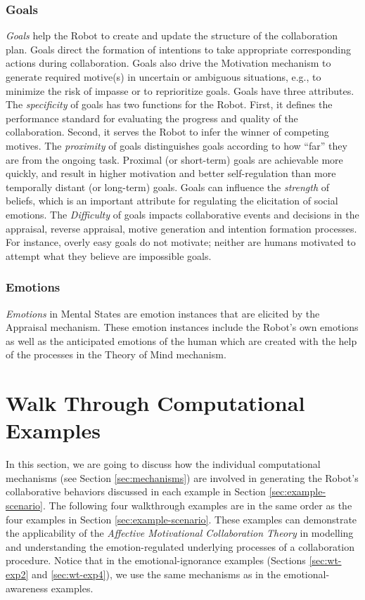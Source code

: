 \subsubsection{Goals}
\label{sec:goals}

\textit{Goals} help the Robot to create and update the structure of the
collaboration plan. Goals direct the formation of intentions to take appropriate
corresponding actions during collaboration. Goals also drive the Motivation
mechanism to generate required motive(s) in uncertain or ambiguous situations,
e.g., to minimize the risk of impasse or to reprioritize goals. Goals have
three attributes. The \textit{specificity} of goals has two functions for the
Robot. First, it defines the performance standard for evaluating the progress
and quality of the collaboration. Second, it serves the Robot to infer the
winner of competing motives. The \textit{proximity} of goals distinguishes goals
according to how ``far'' they are from the ongoing task. Proximal (or
short-term) goals are achievable more quickly, and result in higher motivation
and better self-regulation than more temporally distant (or long-term) goals.
Goals can influence the \textit{strength} of beliefs, which is an important
attribute for regulating the elicitation of social emotions. The
\textit{Difficulty} of goals impacts collaborative events and decisions in the
appraisal, reverse appraisal, motive generation and intention formation
processes. For instance, overly easy goals do not motivate; neither are humans
motivated to attempt what they believe are impossible goals.

\subsubsection{Emotions}

\textit{Emotions} in Mental States are emotion instances that are elicited by
the Appraisal mechanism. These emotion instances include the Robot's own
emotions as well as the anticipated emotions of the human which are created with
the help of the processes in the Theory of Mind mechanism.

\section{Walk Through Computational Examples}
\label{sec:wtce}

In this section, we are going to discuss how the individual computational
mechanisms (see Section \ref{sec:mechanisms}) are involved in generating the
Robot's collaborative behaviors discussed in each example in Section
\ref{sec:example-scenario}. The following four walkthrough examples are in the
same order as the four examples in Section \ref{sec:example-scenario}. These
examples can demonstrate the applicability of the \textit{Affective Motivational
Collaboration Theory} in modelling and understanding the emotion-regulated
underlying processes of a collaboration procedure. Notice that in the
emotional-ignorance examples (Sections \ref{sec:wt-exp2} and \ref{sec:wt-exp4}),
we use the same mechanisms as in the emotional-awareness examples.

